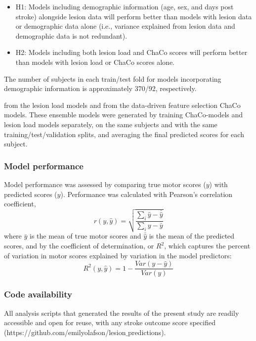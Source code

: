 \documentclass[10pt]{article}
\begin{document}
\begin{itemize}
\item H1: Models including demographic information (age, sex, and days post stroke) alongside lesion data will perform better than models with lesion data or demographic data alone (i.e., variance explained from lesion data and demographic data is not redundant).
\item H2: Models including both lesion load and ChaCo scores will perform better than models with lesion load or ChaCo scores alone.
\end{itemize}

 The number of subjects in each train/test fold for models incorporating demographic information is approximately 370/92, respectively.

from the lesion load models and from the data-driven feature selection ChaCo models. These ensemble models were generated by training ChaCo-models and lesion load models separately, on the same subjects and with the same training/test/validation splits, and averaging the final predicted scores for each subject. 



\subsubsection*{Model performance}
Model performance was assessed by comparing true motor scores ($y$) with predicted scores ($\hat{y}$). Performance was calculated with Pearson's correlation coefficient, 
\begin{equation}
    r(y, \hat{y}) = \sqrt{\frac{\sum_i{\hat{y}-\bar{\hat{y}}}}{\sum_i{y-\bar{y}}}}
\end{equation}
where $\bar{y}$ is the mean of true motor scores and  $\bar{\hat{y}}$ is the mean of the predicted scores, and by the coefficient of determination, or $R^2$, which captures the percent of variation in motor scores explained by variation in the model predictors:
\begin{equation}
    R^2(y, \hat{y}) = 1 - \frac{Var(y-\hat{y})}{Var(y)}
\end{equation}

\subsubsection*{Code availability}
All analysis scripts that generated the results of the present study are readily accessible and open for reuse, with any stroke outcome score specified (https://github.com/emilyolafson/lesion$\_$predictions).
\end{document}
